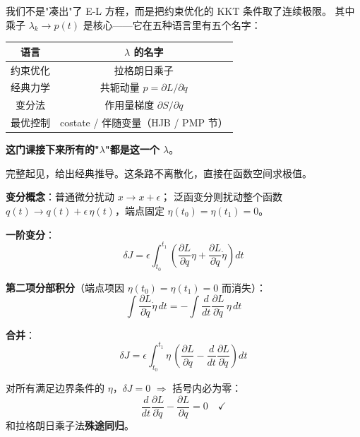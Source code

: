\documentclass[12pt, a4paper]{ctexart}
\begin{document}
\begin{keypoint}

我们不是"凑出"了 E-L 方程，而是把约束优化的 KKT 条件取了连续极限。
其中乘子 $\lambda_k \to p(t)$ 是核心——它在五种语言里有五个名字：
\begin{center}
\begin{tabular}{c|c}
\toprule
语言 & $\lambda$ 的名字 \\
\midrule
约束优化 & 拉格朗日乘子 \\
经典力学 & 共轭动量 $p = \partial L / \partial \dot q$ \\
变分法 & 作用量梯度 $\partial S / \partial q$ \\
最优控制 & costate / 伴随变量（HJB / PMP 节） \\
\bottomrule
\end{tabular}
\end{center}
\textbf{这门课接下来所有的"$\lambda$"都是这一个 $\lambda$}。

\end{keypoint}

\begin{blackboard}[另一种推导：经典变分法（$\delta J = 0$）]

完整起见，给出经典推导。这条路不离散化，直接在函数空间求极值。

\textbf{变分概念}：普通微分扰动 $x \to x + \epsilon$；
泛函变分则扰动整个函数 $q(t) \to q(t) + \epsilon\,\eta(t)$，端点固定 $\eta(t_0) = \eta(t_1) = 0$。

\textbf{一阶变分}：
\[
\delta J = \epsilon \int_{t_0}^{t_1}\left( \frac{\partial L}{\partial q}\eta + \frac{\partial L}{\partial \dot q}\dot\eta \right) dt
\]

\textbf{第二项分部积分}（端点项因 $\eta(t_0) = \eta(t_1) = 0$ 而消失）：
\[
\int \frac{\partial L}{\partial \dot q}\dot\eta\, dt = -\int \frac{d}{dt}\frac{\partial L}{\partial \dot q}\,\eta\, dt
\]

\textbf{合并}：
\[
\delta J = \epsilon \int_{t_0}^{t_1} \eta\,\left(\frac{\partial L}{\partial q} - \frac{d}{dt}\frac{\partial L}{\partial \dot q}\right) dt
\]

对所有满足边界条件的 $\eta$，$\delta J = 0$ $\Longrightarrow$ 括号内必为零：
\[
\frac{d}{dt}\frac{\partial L}{\partial \dot q} - \frac{\partial L}{\partial q} = 0\quad\checkmark
\]
和拉格朗日乘子法\textbf{殊途同归}。

\end{blackboard}
\end{document}
